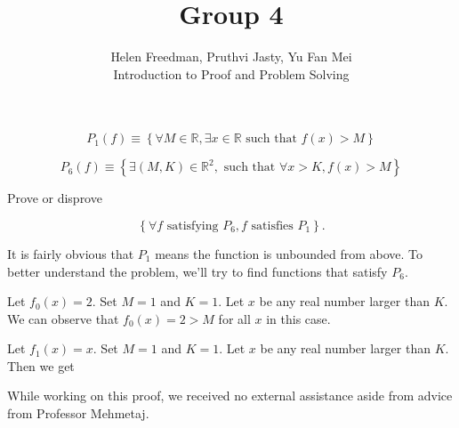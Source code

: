 \documentclass[12pt]{article}
\newenvironment{problem}[2][Problem]{\begin{trivlist}
\item[\hskip \labelsep {\bfseries #1}\hskip \labelsep {\bfseries #2.}]}{\end{trivlist}}
\newenvironment{example}[2][Example]{\begin{trivlist}
\item[\hskip \labelsep {\bfseries #1}\hskip \labelsep {\bfseries #2.}]}{\end{trivlist}}
\begin{document}

\title{Group 4}%
\author{Helen Freedman, Pruthvi Jasty, Yu Fan Mei\\ %
	Introduction to Proof and Problem Solving} %
\maketitle

\begin{problem}{4a} %

    $$P_1 (f) \equiv \left\{ \forall M \in \mathbb{R}, \exists x \in \mathbb{R} \text{ such that } f(x) > M \right\}$$

    $$P_6 (f) \equiv \left\{ \exists (M, K) \in \mathbb{R}^2, \text{ such that } \forall x > K, f(x) > M \right\}$$

    Prove or disprove

    $$ \left\{ \forall f \text{ satisfying } P_6, f \text{ satisfies } P_1 \right\}. $$

\end{problem}

\begin{example}{1} It is fairly obvious that $P_1$ means the function is unbounded from above. To better understand the problem, we'll try to find functions that satisfy $P_6$.



    Let $f_0(x) = 2$. Set $M = 1$ and $K = 1$. Let $x$ be any real number larger than $K$. We can observe that $f_0(x) = 2 > M$ for all $x$ in this case.

    Let $f_1(x) = x$. Set $M = 1$ and $K = 1$. Let $x$ be any real number larger than $K$. Then we get 

\end{example}


\noindent While working on this proof, we received no external assistance aside from advice from Professor Mehmetaj.
\end{document}
